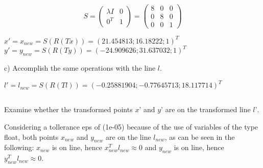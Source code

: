 \documentclass[a4paper,headings=small]{scrartcl}
\numberwithin{equation}{section} %
\numberwithin{figure}{section}   %
\begin{document}
\[S= 
\left( \begin{array}{cc}
\lambda I & 0  \\
0^T & 1   \end{array} \right)
=
\left( \begin{array}{ccc}
8 & 0 & 0 \\
0 & 8 & 0 \\
0 & 0 & 1 \end{array} \right)\] 

$x'=x_{new}=S(R(Tx))=(21.454813; 16.18222; 1)^T$ \newline
$y'=y_{new}=S(R(Ty))=(-24.909626; 31.637032; 1)^T$ \newline

c) Accomplish the same operations with the line $l$. \newline

      $l'=l_{new}=S(R(Tl))=(-0.25881904; -0.77645713; 18.117714)^T$




\subsection{}

Examine whether the transformed points $x’$ and $y’$ are
on the transformed line $l’$. \newline

Considering a tollerance eps of (1e-05) because of the use of variables of the type float, both points $x_{new}$ and $y_{new}$ 
are on the line $l_{new}$, as can be seen in the following: \newline
$x_{new}$ is on line, hence $x_{new}^Tl_{new} \approx 0$ and $y_{new}$ is on line, hence $y_{new}^Tl_{new} \approx 0$. \newline
\end{document}
